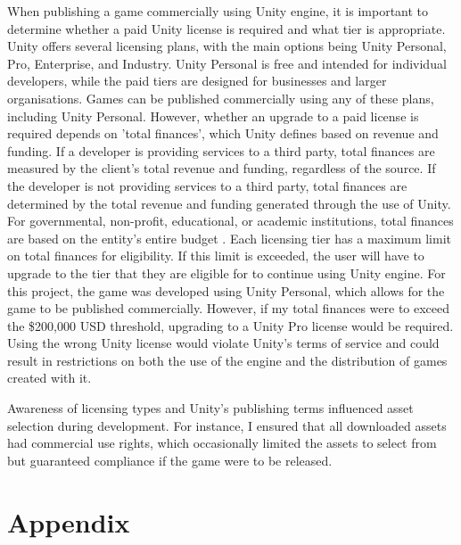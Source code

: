 \documentclass[10pt]{final_report}
\begin{document}
When publishing a game commercially using Unity engine, it is important to determine whether a paid Unity license is required and what tier is appropriate. Unity offers several licensing plans, with the main options being Unity Personal, Pro, Enterprise, and Industry. Unity Personal is free and intended for individual developers, while the paid tiers are designed for businesses and larger organisations.
Games can be published commercially using any of these plans, including Unity Personal. However, whether an upgrade to a paid license is required depends on 'total finances', which Unity defines based on revenue and funding. If a developer is providing services to a third party, total finances are measured by the client’s total revenue and funding, regardless of the source. If the developer is not providing services to a third party, total finances are determined by the total revenue and funding generated through the use of Unity. For governmental, non-profit, educational, or academic institutions, total finances are based on the entity’s entire budget \cite{UnityTC}.
Each licensing tier has a maximum limit on total finances for eligibility. If this limit is exceeded, the user will have to upgrade to the tier that they are eligible for to continue using Unity engine. For this project, the game was developed using Unity Personal, which allows for the game to be published commercially. However, if my total finances were to exceed the \$200,000 USD threshold, upgrading to a Unity Pro license would be required. Using the wrong Unity license would violate Unity's terms of service and could result in restrictions on both the use of the engine and the distribution of games created with it.\newline

Awareness of licensing types and Unity’s publishing terms influenced asset selection during development. For instance, I ensured that all downloaded assets had commercial use rights, which occasionally limited the assets to select from but guaranteed compliance if the game were to be released.


\appendix
\chapter{Appendix}
\end{document}
